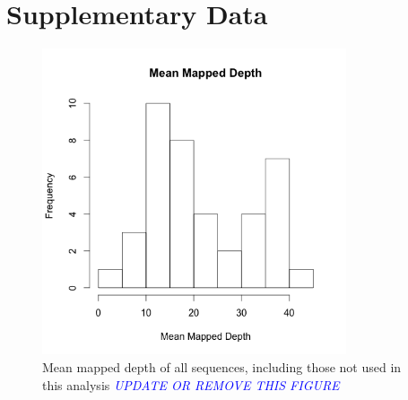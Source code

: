 \documentclass[12pt]{article}
\newcommand{\dv}[1]{\textcolor{blue}{\emph{#1}}}
\begin{document}
\section*{Supplementary Data}
%
\begin{figure}[b]
\centering
   \includegraphics[width=0.8\textwidth]{depthBQ20MQ30.png}
  \caption{Mean mapped depth of all sequences, including those not used in this analysis \dv{UPDATE OR REMOVE THIS FIGURE}}
  \label{fig:depth}
\end{figure}
%
\end{document}
